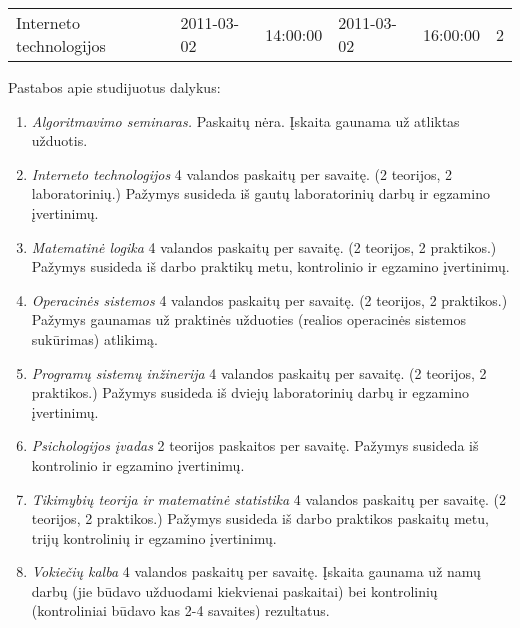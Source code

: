 \begin{tabularx}{\textwidth}{p{6em} X X X X X}
 Interneto technologijos   & 2011-03-02  & 14:00:00   & 2011-03-02 &  16:00:00   & 2\\
\end{tabularx}

Pastabos apie studijuotus dalykus:
\begin{enumerate}
  \item
    \label{note:algoritmavimo_seminaras}
    \emph{Algoritmavimo seminaras.} 
    Paskaitų nėra. Įskaita gaunama už atliktas užduotis.
  \item
    \label{note:interneto_technologijos}
    \emph{Interneto technologijos}
    4 valandos paskaitų per savaitę. (2 teorijos, 2 laboratorinių.)
    Pažymys susideda iš gautų laboratorinių darbų ir egzamino 
    įvertinimų.
  \item
    \label{note:matematine_logika}
    \emph{Matematinė logika}
    4 valandos paskaitų per savaitę. (2 teorijos, 2 praktikos.)
    Pažymys susideda iš darbo praktikų metu, kontrolinio ir egzamino
    įvertinimų.
  \item
    \label{note:operacines_sistemos}
    \emph{Operacinės sistemos}
    4 valandos paskaitų per savaitę. (2 teorijos, 2 praktikos.)
    Pažymys gaunamas už praktinės užduoties (realios operacinės
    sistemos sukūrimas) atlikimą.
  \item
    \label{note:programu_sistemu_inzinerija}
    \emph{Programų sistemų inžinerija}
    4 valandos paskaitų per savaitę. (2 teorijos, 2 praktikos.)
    Pažymys susideda iš dviejų laboratorinių darbų ir egzamino įvertinimų.
  \item
    \label{note:psichologijos_ivadas}
    \emph{Psichologijos įvadas}
    2 teorijos paskaitos per savaitę.
    Pažymys susideda iš kontrolinio ir egzamino įvertinimų.
  \item
    \label{note:tikimybiu_teorija}
    \emph{Tikimybių teorija ir matematinė statistika}
    4 valandos paskaitų per savaitę. (2 teorijos, 2 praktikos.)
    Pažymys susideda iš darbo praktikos paskaitų metu, trijų kontrolinių
    ir egzamino įvertinimų.
  \item 
    \label{note:vokieciu_kalba}
    \emph{Vokiečių kalba}
    4 valandos paskaitų per savaitę.
    Įskaita gaunama už namų darbų (jie būdavo užduodami kiekvienai
    paskaitai) bei kontrolinių (kontroliniai būdavo kas 2-4 savaites)
    rezultatus.
\end{enumerate}
